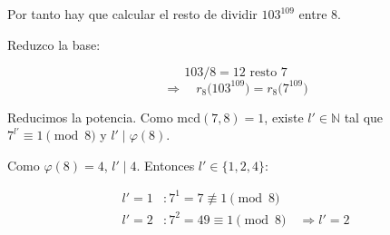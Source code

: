 \documentclass[a4paper,12pt]{article}
\begin{document}
\begin{ejercicio}[title=Ejercicio 28]
Por tanto hay que calcular el resto de dividir $103^{109}$ entre $8$.

Reduzco la base:

\[
103 / 8 = 12 \text{ resto } 7
\]
\[
\Rightarrow\quad r_{8}\bigl(103^{109}\bigr) = r_{8}\bigl(7^{109}\bigr)
\]

Reducimos la potencia. Como $\mathrm{mcd}(7,8)=1$, existe $l'\in\mathbb{N}$ tal que $7^{l'}\equiv 1\pmod{8}$ y $l'\mid\varphi(8)$.

\vspace{0.5em}

Como $\varphi(8)=4$, $l'\mid 4$. Entonces $l'\in\{1,2,4\}$:

\[
\begin{aligned}
l'=1 &: 7^1 = 7 \not\equiv 1 \pmod{8} \\
l'=2 &: 7^2 = 49 \equiv 1 \pmod{8} \quad \Rightarrow l' = 2
\end{aligned}
\]

\end{ejercicio}
\end{document}
